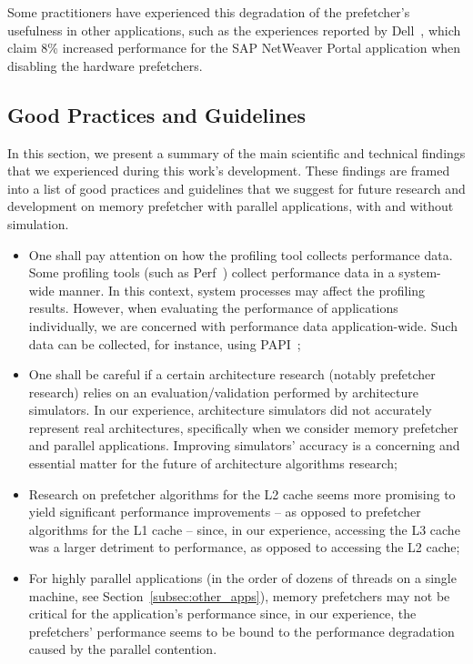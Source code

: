 \documentclass[AMA,final,STIX1COL]{WileyNJD-v2}
\begin{document}
Some practitioners have experienced this degradation of the prefetcher's usefulness in other applications, such as the experiences reported by Dell~\cite{SAPguide}, which claim 8\% increased performance for the SAP NetWeaver Portal application when disabling the hardware prefetchers.

\subsection{Good Practices and Guidelines}
\label{subsec:practices_n_experiences}
In this section, we present a summary of the main scientific and technical findings that we experienced during this work's development. These findings are framed into a list of good practices and guidelines that we suggest for future research and development on memory prefetcher with parallel applications, with and without simulation.

\begin{itemize}
    \item One shall pay attention on how the profiling tool collects performance data. Some profiling tools (such as Perf~\cite{de2010new}) collect performance data in a system-wide manner. In this context, system processes may affect the profiling results. However, when evaluating the performance of applications individually, we are concerned with performance data application-wide. Such data can be collected, for instance, using PAPI~\cite{terpstra2010papi};
    
    \item One shall be careful if a certain architecture research (notably prefetcher research) relies on an evaluation/validation performed by architecture simulators. In our experience, architecture simulators did not accurately represent real architectures, specifically when we consider memory prefetcher and parallel applications. Improving simulators' accuracy is a concerning and essential matter for the future of architecture algorithms research;
    
    \item Research on prefetcher algorithms for the L2 cache seems more promising to yield significant performance improvements -- as opposed to prefetcher algorithms for the L1 cache -- since, in our experience, accessing the L3 cache was a larger detriment to performance, as opposed to accessing the L2 cache;
    
    \item For highly parallel applications (in the order of dozens of threads on a single machine, see Section~\ref{subsec:other_apps}), memory prefetchers may not be critical for the application's performance since, in our experience, the prefetchers' performance seems to be bound to the performance degradation caused by the parallel contention.
\end{itemize}
\end{document}
